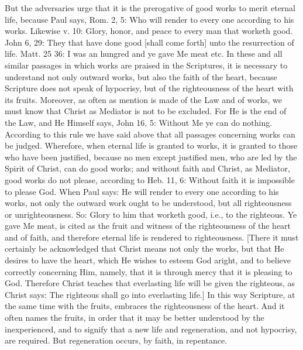 But the adversaries urge that it is the prerogative of good works to
merit eternal life, because Paul says, Rom. 2, 5: Who will render to
every one according to his works.  Likewise v. 10: Glory, honor, and
peace to every man that worketh good.  John 6, 29: They that have
done good [shall come forth] unto the resurrection of life.  Matt. 25
36: I was an hungred and ye gave Me meat etc. In these and all
similar passages in which works are praised in the Scriptures, it is
necessary to understand not only outward works, but also the faith of
the heart, because Scripture does not speak of hypocrisy, but of the
righteousness of the heart with its fruits.  Moreover, as often as
mention is made of the Law and of works, we must know that Christ as
Mediator is not to be excluded.  For He is the end of the Law, and He
Himself says, John 16, 5: Without Me ye can do nothing.  According to
this rule we have said above that all passages concerning works can
be judged.  Wherefore, when eternal life is granted to works, it is
granted to those who have been justified, because no men except
justified men, who are led by the Spirit of Christ, can do good works;
and without faith and Christ, as Mediator, good works do not please,
according to Heb. 11, 6: Without faith it is impossible to please God.
When Paul says: He will render to every one according to his works,
not only the outward work ought to be understood, but all
righteousness or unrighteousness.  So: Glory to him that worketh good,
i.e., to the righteous.  Ye gave Me meat, is cited as the fruit and
witness of the righteousness of the heart and of faith, and therefore
eternal life is rendered to righteousness.  [There it must certainly
be acknowledged that Christ means not only the works, but that He
desires to have the heart, which He wishes to esteem God aright, and
to believe correctly concerning Him, namely, that it is through mercy
that it is pleasing to God.  Therefore Christ teaches that
everlasting life will be given the righteous, as Christ says: The
righteous shall go into everlasting life.] In this way Scripture, at
the same time with the fruits, embraces the righteousness of the
heart.  And it often names the fruits, in order that it may be better
understood by the inexperienced, and to signify that a new life and
regeneration, and not hypocrisy, are required.  But regeneration
occurs, by faith, in repentance.


